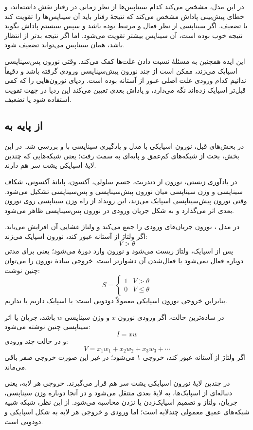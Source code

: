 در این مدل،  مشخص می‌کند کدام سیناپس‌ها از نظر زمانی در رفتار نقش داشته‌اند، و خطای پیش‌بینی پاداش مشخص می‌کند که نتیجهٔ رفتار باید آن سیناپس‌ها را تقویت کند یا تضعیف. اگر سیناپسی از نظر  فعال و مرتبط بوده باشد و سپس سیستم پاداش بگوید نتیجه خوب بوده است، آن سیناپس بیشتر تقویت می‌شود. اما اگر نتیجه بدتر از انتظار باشد، همان سیناپس می‌تواند تضعیف شود.

این ایده همچنین به مسئلهٔ نسبت دادن علت‌ها کمک می‌کند. وقتی نورون پس‌سیناپسی اسپایک می‌زند، ممکن است از چند نورون پیش‌سیناپسی ورودی گرفته باشد و دقیقاً ندانیم کدام ورودی علت اصلی عبور از آستانه بوده است.  ردپای نورون‌هایی را که کمی قبل‌تر اسپایک زده‌اند نگه می‌دارد، و پاداش بعدی تعیین می‌کند این ردپا در جهت تقویت استفاده شود یا تضعیف.

\subsection{از  پایه به }
در بخش‌های قبل، نورون اسپایکی با مدل  و یادگیری سیناپسی با  و  بررسی شد. در این بخش، بحث از شبکه‌های کم‌عمق و پایه‌ای به سمت  رفت؛ یعنی شبکه‌هایی که چندین لایهٔ اسپایکی پشت سر هم دارند.

در یادآوری زیستی، نورون از دندریت، جسم سلولی، آکسون، پایانهٔ آکسونی، شکاف سیناپسی و وزن سیناپسی میان نورون پیش‌سیناپسی و پس‌سیناپسی تشکیل می‌شود. وقتی نورون پیش‌سیناپسی اسپایک می‌زند، این رویداد از راه وزن سیناپسی روی نورون بعدی اثر می‌گذارد و به شکل جریان ورودی در نورون پس‌سیناپسی ظاهر می‌شود.

در مدل ، نورون جریان‌های ورودی را جمع می‌کند و ولتاژ غشایی آن افزایش می‌یابد. اگر ولتاژ از آستانه عبور کند، نورون اسپایک می‌زند:
\[
V > \theta
\]
پس از اسپایک، ولتاژ ریست می‌شود و نورون وارد دورهٔ  می‌شود؛ یعنی برای مدتی دوباره فعال نمی‌شود یا فعال‌شدن آن دشوارتر است. خروجی سادهٔ نورون را می‌توان چنین نوشت:
\[
S =
\begin{cases}
1 & V > \theta \\
0 & V \leq \theta
\end{cases}
\]
بنابراین خروجی نورون اسپایکی معمولاً دودویی است: یا اسپایک داریم یا نداریم.

در ساده‌ترین حالت، اگر ورودی نورون \(x\) و وزن سیناپسی \(w\) باشد، جریان یا اثر سیناپسی چنین نوشته می‌شود:
\[
I = xw
\]
و در حالت چند ورودی:
\[
V = x_1w_1 + x_2w_2 + x_3w_3 + \cdots
\]
اگر ولتاژ از آستانه عبور کند، خروجی ۱ می‌شود؛ در غیر این صورت خروجی صفر باقی می‌ماند.

در  چندین لایهٔ نورون اسپایکی پشت سر هم قرار می‌گیرند. خروجی هر لایه، یعنی دنباله‌ای از اسپایک‌ها، به لایهٔ بعدی منتقل می‌شود و در آنجا دوباره وزن سیناپسی، جریان، ولتاژ و تصمیم اسپایک‌زدن یا نزدن محاسبه می‌شود. از این نظر، شبکه شبیه شبکه‌های عمیق معمولی چندلایه است؛ اما ورودی و خروجی هر لایه به شکل اسپایکی و دودویی است.

